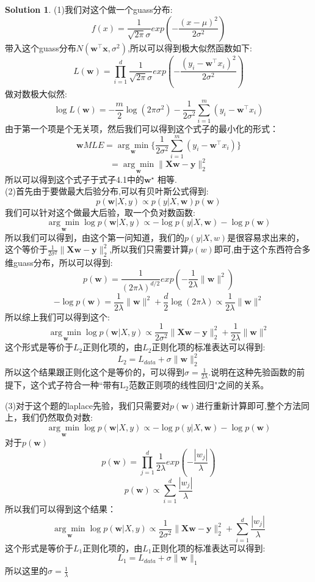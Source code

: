 \documentclass[a4paper,UTF8]{article}
\numberwithin{equation}{section}
\theoremstyle{definition}
\newtheorem*{solution}{Solution}
\newcommand{\vct}[1]{\boldsymbol{#1}} %
\newcommand{\vw}{\vct{w}}
\newcommand{\vx}{\vct{x}}
\newcommand{\vy}{\vct{y}}
\newcommand{\mat}[1]{\boldsymbol{#1}} %
\newcommand{\mX}{\mat{X}}
\begin{document}
\begin{solution}
(1)我们对这个做一个guass分布:\\
\[  f(x) = \frac{1}{\sqrt{2\pi}\sigma}exp(-\frac{(x- \mu)^2}{2\sigma^2})\]
带入这个guass分布$N(\vw^{\top}\vx, \sigma^2)$,所以可以得到极大似然函数如下:\\
\[  L(\vw) = \prod_{i=1}^{d}\frac{1}{\sqrt{2\pi}\sigma} exp(-\frac{(y_i - \vw^{\top}x_i)^2}{2\sigma^2})\]
做对数极大似然:\\
\[  \log L(\vw) = -\frac{m}{2}\log(2\pi \sigma^2) - \frac{1}{2\sigma^2}\sum_{i=1}^{m}(y_i - \vw^{\top}x_i)\]
由于第一个项是个无关项，然后我们可以得到这个式子的最小化的形式：\\
\[  \vw{MLE} = \underset{\vw}{\arg\min}\{\frac{1}{2\sigma^2}\sum_{i=1}^{m}(y_i - \vw^{\top}x_i)\}\]
\[ =\underset{\vw}{\arg\min}\|\mX\vw-\vy\|_2^2\]
所以可以得到这个式子于式子4.1中的$\vw^\star$ 相等.\\

(2)首先由于要做最大后验分布,可以有贝叶斯公式得到:\\
\[  p(\vw|X, y) \propto p(y|X,\vw) p(\vw)\]
我们可以针对这个做最大后验，取一个负对数函数:\\
\[  \underset{\vw}{\arg\min} \log p(\vw|X, y) \propto -\log p(y|X,\vw) -\log p(\vw)\]
所以我们可以得到，由这个第一问知道，我们的$p(y|X,w)$是很容易求出来的，这个等价于$\frac{1}{2\sigma^2}\|\mX\vw-\vy\|_2^2$,所以我们只需要计算$p(w)$即可,由于这个东西符合多维guass分布，所以可以得到:\\
\[  p(\vw) = \frac{1}{(2\pi \lambda)^{d/2}}exp(-\frac{1}{2\lambda}\|\vw\|^2 )\]
\[  -\log p(\vw) = \frac{1}{2\lambda}\|\vw\|^2 + \frac{d}{2}\log(2\pi \lambda) \propto \frac{1}{2\lambda}\|\vw\|^2 \]
所以综上我们可以得到这个:\\
\[  \underset{\vw}{\arg\min} \log p(\vw|X, y) \propto \frac{1}{2\sigma^2}\|\mX\vw-\vy\|_2^2 +\frac{1}{2\lambda}\|\vw\|^2 \]
这个形式是等价于$L_2$正则化项的，由$L_2$正则化项的标准表达可以得到:\\
\[  L_2 = L_{data} + \sigma \|\vw\|_2^2\]
所以这个结果跟正则化这个是等价的，可以得到$\sigma = \frac{1}{2\lambda}$.说明在这种先验函数的前提下，这个式子符合一种``带有$\mathrm{L}_2$范数正则项的线性回归"之间的关系。

(3)对于这个题的laplace先验，我们只需要对$p(\vw)$进行重新计算即可,整个方法同上，我们仍然取负对数:\\
\[  \underset{\vw}{\arg\min} \log p(\vw|X, y) \propto -\log p(y|X,\vw) -\log p(\vw)\]
对于$p(\vw)$\\
\[  p(\vw) = \prod_{j=1}^{d} \frac{1}{2\lambda}exp(-\frac{|w_j|}{\lambda})\]
\[  p(\vw) \propto \sum_{i=1}^{d}\frac{|w_j|}{\lambda}\]
所以我们可以得到这个结果：\\
\[  \underset{\vw}{\arg\min} \log p(\vw|X, y) \propto \frac{1}{2\sigma^2}\|\mX\vw-\vy\|_2^2 + \sum_{i=1}^{d}\frac{|w_j|}{\lambda} \]
这个形式是等价于$L_1$正则化项的，由$L_1$正则化项的标准表达可以得到:\\
\[  L_1 = L_{data} + \sigma \|\vw\|_1\]
所以这里的$\sigma = \frac{1}{\lambda}$


\end{solution}
\end{document}
